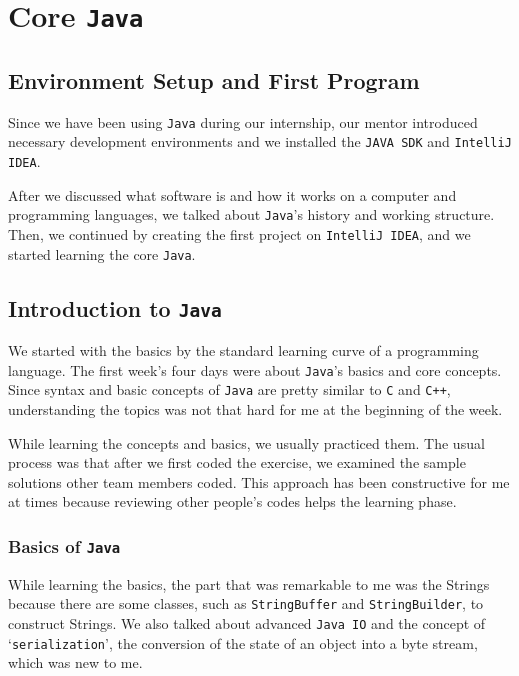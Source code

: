 \section{Core \texttt{Java}}

\subsection{Environment Setup and First Program}

Since we have been using \texttt{\texttt{Java}} during our internship, our mentor introduced necessary development environments and we installed the \texttt{JAVA SDK} and \texttt{IntelliJ IDEA}.

After we discussed what software is and how it works on a computer and programming languages, we talked about \texttt{Java}'s history and working structure. Then, we continued by creating the first project on \texttt{IntelliJ IDEA}, and we started learning the core \texttt{Java}.


\subsection{Introduction to \texttt{Java}}

We started with the basics by the standard learning curve of a programming language. The first week's four days were about \texttt{Java}'s basics and core concepts. Since syntax and basic concepts of \texttt{\texttt{Java}} are pretty similar to \texttt{C} and \texttt{C++}, understanding the topics was not that hard for me at the beginning of the week.

While learning the concepts and basics, we usually practiced them. The usual process was that after we first coded the exercise, we examined the sample solutions other team members coded. This approach has been constructive for me at times because reviewing other people's codes helps the learning phase.

\subsubsection{Basics of \texttt{Java}}

While learning the basics, the part that was remarkable to me was the Strings because there are some classes, such as \texttt{StringBuffer} and \texttt{StringBuilder}, to construct Strings. We also talked about advanced \texttt{Java IO} and the concept of `\texttt{serialization}', the conversion of the state of an object into a byte stream, which was new to me.

